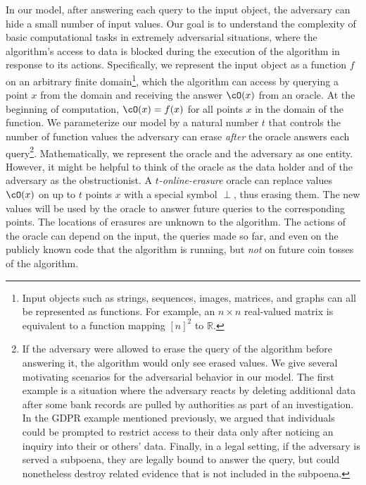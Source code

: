 \documentclass{toc}
\begin{document}
In our model, after answering each query to the input object, the adversary can hide a small number of input values. Our goal is to understand the complexity of basic computational tasks in extremely adversarial situations, where the algorithm's access to data is blocked during the execution of the algorithm in response to its actions.
Specifically, we represent the input object as a function $f$ on an arbitrary finite domain\footnote{Input objects such as strings, sequences, images, matrices, and graphs can all be represented as functions. For example, an $n \times n$ real-valued matrix is equivalent to a function mapping $[n]^2$ to $\mathbb{R}$.}, which the algorithm can access by querying a point $x$ from the domain and receiving the answer $\cO(x)$ from %
an
oracle. At the beginning of computation, $\cO(x)=f(x)$ for all points $x$ in the domain of the function. We parameterize our model by a natural number $t$ that controls the number of function values the adversary %
can erase {\em after} the oracle %
answers each query\footnote{If the adversary were allowed to erase the query of the algorithm before answering it, the algorithm would only see erased values. We give several motivating scenarios for the adversarial behavior in our model. The first example is a situation where the adversary reacts by deleting additional data after some bank records are pulled by authorities as part of an investigation. In the GDPR example mentioned previously, we argued that individuals could be prompted to restrict access to their data only after noticing an inquiry into their or others' data. Finally, in a legal setting, if the adversary is served a subpoena, they are legally bound to answer the query, but could nonetheless destroy related evidence that is not included in the subpoena.}. 
Mathematically, we represent the oracle and the adversary as one entity. However, it might be helpful to think of the oracle as the data holder and of the adversary as the obstructionist.
A {\em $t$-online-erasure} oracle can replace values $\cO(x)$ on up to $t$ points $x$ with a special symbol $\perp$, thus erasing them.
The new values will be used by the oracle to answer future queries to the corresponding points. The locations of erasures are unknown to the algorithm.
The actions of the oracle can depend on the input, the queries made so far, and even on the publicly known code that the algorithm is running, but {\em not} on future coin tosses of the algorithm. 
\end{document}
